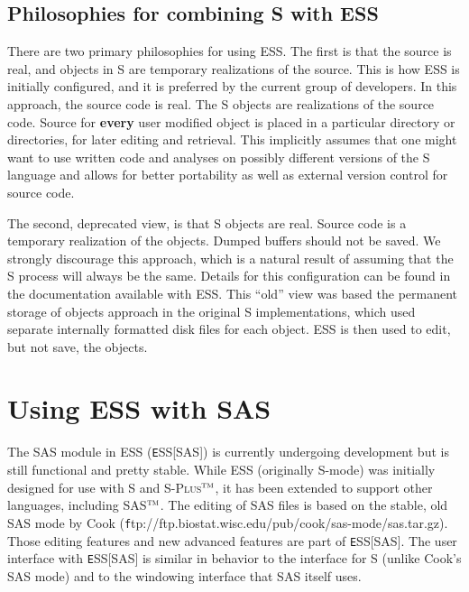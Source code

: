 \documentclass{article}
\newcommand*{\Splus}{\textsc{S-Plus}}
\newcommand{\tm}{$^{\mbox{\scriptsize\sc tm}}$}
\newenvironment{Salltt}{\small\begin{alltt}}{\end{alltt}}
\begin{document}
\subsection{Philosophies for combining S with ESS}
\label{sec:S:philosophy}

There are two primary philosophies for using ESS.  The first is that
the source is real, and objects in S are temporary realizations of the
source.  This is how ESS is initially configured, and it is preferred
by the current group of developers.  In this approach, the source code
is real.  The S objects are realizations of the source code.  Source
for \textbf{every} user modified object is placed in a particular
directory or directories, for later editing and retrieval.  This
implicitly assumes that one might want to use written code and
analyses on possibly different versions of the S language and allows
for better portability as well as external version control for source
code.

The second, deprecated view, is that S objects are real.  Source code
is a temporary realization of the objects.  Dumped buffers
should not be saved.  We strongly discourage this approach, which is a
natural result of assuming that the S process will always be the
same.  Details for this configuration can be found in the
documentation available with ESS.
This ``old'' view was based the permanent storage of objects approach
in the original S implementations, which used separate internally
formatted disk files for each object.  ESS is then used to edit, but
not save, the objects.


\section{Using ESS with SAS}
\label{sec:SAS}

The SAS module in ESS ({\texttt ESS[SAS]}) is currently undergoing
development but is still functional and pretty stable.  While ESS
(originally S-mode) was initially designed for use with S and
\Splus\tm, it has been extended to support other languages, including
SAS\tm.  The editing of SAS files is based on the stable, old SAS mode
by Cook ({\texttt
  ftp://ftp.biostat.wisc.edu/pub/cook/sas-mode/sas.tar.gz}).  Those
editing features and new advanced features are part of {\texttt ESS[SAS]}.
The user interface with {\texttt ESS[SAS]} is similar in behavior to the
interface for S (unlike Cook's SAS mode) and to the windowing
interface that SAS itself uses.
\end{document}
